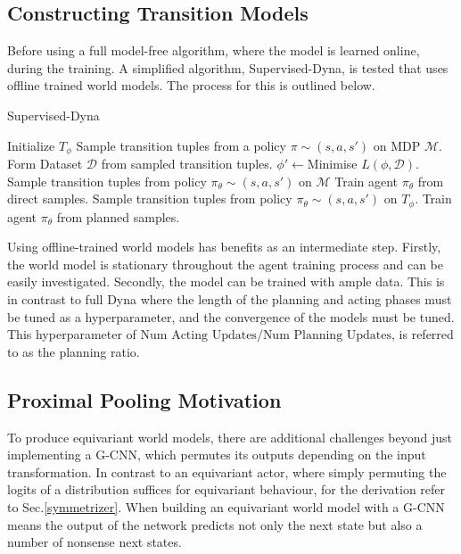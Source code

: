 \subsection{Constructing Transition Models}
Before using a full model-free algorithm, where the model is learned online, during the training. A simplified algorithm, Supervised-Dyna, is tested that uses offline trained world models. The process for this is outlined below.
\begin{algorithm}
	\caption{Supervised-Dyna}\label{alg:Supervised-Dyna}
	\begin{algorithmic}
		\State Initialize $T_\phi$
		\State Sample transition tuples from a policy $\pi \sim (s, a, s')$ on MDP $\mathcal{M}$.
		\State Form Dataset $\mathcal{D}$ from sampled transition tuples.
		\State $\phi' \leftarrow $Minimise $L(\phi , \mathcal{D})$.
		\EndFor
		\State Sample transition tuples from policy $\pi_\theta \sim (s, a, s')$ on $\mathcal{M}$
		\State Train agent $\pi_\theta$ from direct samples.
		\EndFor
		\State Sample transition tuples from policy $\pi_\theta \sim (s, a, s')$ on $T_\phi$.
		\State Train agent $\pi_\theta$ from planned samples.
		\EndFor
		\EndFor
	\end{algorithmic}
\end{algorithm}

Using offline-trained world models has benefits as an intermediate step. Firstly, the world model is stationary throughout the agent training process and can be easily investigated. Secondly, the model can be trained with ample data. This is in contrast to full Dyna where the length of the planning and acting phases must be tuned as a hyperparameter, and the convergence of the models must be tuned. This hyperparameter of $\text{Num Acting Updates}/\text{Num Planning Updates}$, is referred to as the planning ratio.


\subsection{Proximal Pooling Motivation}
To produce equivariant world models, there are additional challenges beyond just implementing a G-CNN, which permutes its outputs depending on the input transformation. In contrast to an equivariant actor, where simply permuting the logits of a distribution suffices for equivariant behaviour, for the derivation refer to Sec.\ref{symmetrizer}. When building an equivariant world model with a G-CNN means the output of the network predicts not only the next state but also a number of nonsense next states.


